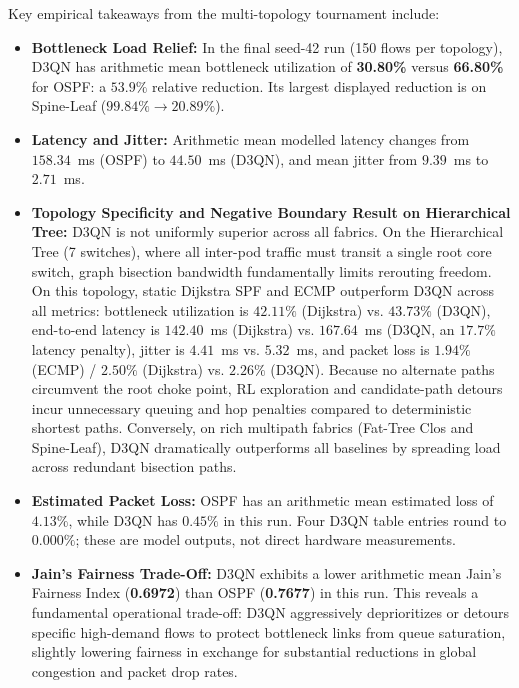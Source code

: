 \documentclass[12pt,a4paper,oneside]{report}
\begin{document}
Key empirical takeaways from the multi-topology tournament include:
\begin{itemize}
    \item \textbf{Bottleneck Load Relief:} In the final seed-42 run (150 flows per topology), D3QN has arithmetic mean bottleneck utilization of \textbf{30.80\%} versus \textbf{66.80\%} for OSPF: a $53.9\%$ relative reduction. Its largest displayed reduction is on Spine-Leaf ($99.84\% \to 20.89\%$).
    \item \textbf{Latency and Jitter:} Arithmetic mean modelled latency changes from $158.34$~ms (OSPF) to $44.50$~ms (D3QN), and mean jitter from $9.39$~ms to $2.71$~ms.
    \item \textbf{Topology Specificity and Negative Boundary Result on Hierarchical Tree:} D3QN is not uniformly superior across all fabrics. On the Hierarchical Tree (7 switches), where all inter-pod traffic must transit a single root core switch, graph bisection bandwidth fundamentally limits rerouting freedom. On this topology, static Dijkstra SPF and ECMP outperform D3QN across all metrics: bottleneck utilization is $42.11\%$ (Dijkstra) vs. $43.73\%$ (D3QN), end-to-end latency is $142.40$~ms (Dijkstra) vs. $167.64$~ms (D3QN, an $17.7\%$ latency penalty), jitter is $4.41$~ms vs. $5.32$~ms, and packet loss is $1.94\%$ (ECMP) / $2.50\%$ (Dijkstra) vs. $2.26\%$ (D3QN). Because no alternate paths circumvent the root choke point, RL exploration and candidate-path detours incur unnecessary queuing and hop penalties compared to deterministic shortest paths. Conversely, on rich multipath fabrics (Fat-Tree Clos and Spine-Leaf), D3QN dramatically outperforms all baselines by spreading load across redundant bisection paths.
    \item \textbf{Estimated Packet Loss:} OSPF has an arithmetic mean estimated loss of $4.13\%$, while D3QN has $0.45\%$ in this run. Four D3QN table entries round to $0.000\%$; these are model outputs, not direct hardware measurements.
    \item \textbf{Jain's Fairness Trade-Off:} D3QN exhibits a lower arithmetic mean Jain's Fairness Index (\textbf{0.6972}) than OSPF (\textbf{0.7677}) in this run. This reveals a fundamental operational trade-off: D3QN aggressively deprioritizes or detours specific high-demand flows to protect bottleneck links from queue saturation, slightly lowering fairness in exchange for substantial reductions in global congestion and packet drop rates.
\end{itemize}
\end{document}
